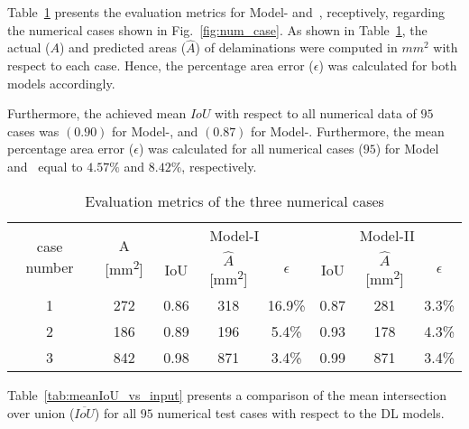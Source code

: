 Table~\ref{tab:num_cases} presents the evaluation metrics for Model- and~, receptively, regarding the numerical cases shown in Fig.~\ref{fig:num_case}.
As shown in Table~\ref{tab:num_cases}, the actual (\(A\)) and predicted areas (\(\hat{A}\)) of delaminations were computed in \(mm^2\) with respect to each case. 
Hence, the percentage area error (\(\epsilon\)) was calculated for both models accordingly.

Furthermore, the achieved mean \(IoU\) with respect to all numerical data of \(95\) cases was \((0.90)\) for Model-, and \((0.87)\) for Model-. 
Furthermore, the mean percentage area error (\(\epsilon\)) was calculated for all numerical cases (\(95\)) for Model~ and~ equal to \(4.57 \%\) and \(8.42\%\), respectively.
\begin{table}[]
	\caption{Evaluation metrics of the three numerical cases}
	\begin{tabular}{cccccccc}
		\toprule
		\multirow{2}{*}{case number} & \multicolumn{1}{c}{\multirow{2}{*}{A [mm\textsuperscript{2}]}} & \multicolumn{3}{c}{Model-I} & \multicolumn{3}{c}{Model-II} \\ \cmidrule(lr){3-5} \cmidrule(lr){6-8} 
		& \multicolumn{1}{c}{}  & \multicolumn{1}{c}{IoU}  & \multicolumn{1}{c}{\(\hat{A}\) [mm\textsuperscript{2}]} & \(\epsilon\) & \multicolumn{1}{c}{IoU}  & \multicolumn{1}{c}{\(\hat{A}\) [mm\textsuperscript{2}]} & \(\epsilon\) \\ 
		\midrule
		1 & 272 & \multicolumn{1}{c}{0.86} & \multicolumn{1}{c}{318} & 16.9\% & \multicolumn{1}{c}{0.87} & \multicolumn{1}{c}{281} & 3.3\% \\ 
		2 &  186  & \multicolumn{1}{c}{0.89} & \multicolumn{1}{c}{196} & 5.4\% & \multicolumn{1}{c}{0.93} & \multicolumn{1}{c}{178} & 4.3\% \\ 
		3 & 842 & \multicolumn{1}{c}{0.98} &\multicolumn{1}{c}{871} & 3.4\%   & \multicolumn{1}{c}{0.99} & \multicolumn{1}{c}{871} & 3.4\% \\ 
		\bottomrule
	\end{tabular}	
	\label{tab:num_cases}
\end{table}
Table~\ref{tab:meanIoU_vs_input} presents a comparison of the mean intersection over union (\(\overline{IoU}\)) for all \(95\) numerical test cases with respect to the DL models.
